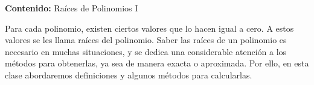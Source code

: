{\Large\textbf{Contenido:} Raíces de Polinomios I}

Para cada polinomio, existen ciertos valores que lo hacen igual a cero.
A estos valores se les llama raíces del polinomio.
Saber las raíces de un polinomio es necesario en muchas situaciones, y se dedica una considerable atención a los métodos para obtenerlas, ya sea de manera exacta o aproximada.
Por ello, en esta clase abordaremos definiciones y algunos métodos para calcularlas.